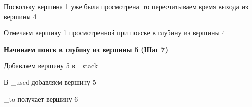 \documentclass[a4paper]{article}
\begin{document}
  \begin{figure}[!h]
  \end{figure}
\par
  Поскольку вершина 1 уже была просмотрена, то пересчитываем время выхода из вершины 4\par
  Отмечаем вершину 1 просмотренной при поиске в глубину из вершины 4
\newpage

\textbf{Начинаем поиск в глубину из вершины 5 (Шаг 7)}
  \begin{figure}[!h]
  \end{figure}
\par
  Добавляем вершину 5 в \_stack\par
  В \_used добавляем вершину 5\par
  \_to получает вершину 6\par
\newpage
\end{document}
